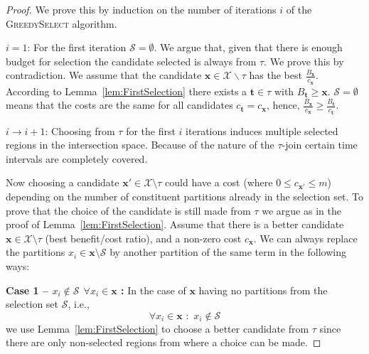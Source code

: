 \begin{proof}{} We prove this by induction on the number of iterations $i$ of the \textsc{GreedySelect} algorithm. 

$i=1$: For the first iteration $\mathcal{S} = \emptyset$. We argue that, given that there is enough budget for selection the candidate selected is always from $\tau$. We prove this by contradiction. We
 assume that the candidate $\mathbf{x} \in \mathcal{X}\backslash \tau$ has the best $\frac{B_\mathbf{x}}{c_\mathbf{x}}$. According to Lemma~\ref{lem:FirstSelection} there exists a $\mathbf{t} \in \tau$ with $B_\mathbf{t} \geq \mathbf{x}$. $\mathcal{S} = \emptyset$ means that the costs are the same for all candidates $c_\mathbf{t} = c_\mathbf{x}$, hence, $\frac{B_\mathbf{x}}{c_\mathbf{x}} \geq \frac{B_\mathbf{t}}{c_\mathbf{t}}$. 

$i\rightarrow i+1$: Choosing from $\tau$ for the first $i$ iterations induces multiple selected regions in the intersection space. Because of the nature of the $\tau$-join certain time intervals are completely covered. 


Now choosing a candidate $\mathbf{x'} \in \mathcal{X}\setminus \tau$ could have a cost (where $0 \le c_\mathbf{x'} \le m$) depending on the number of constituent partitions already in the selection set. To prove that the choice of the candidate is still made from $\tau$ we argue as in the proof of Lemma~\ref{lem:FirstSelection}. Assume that there is a better candidate $\mathbf{x} \in \mathcal{X}\setminus \tau$  (best benefit/cost ratio), and a non-zero cost $c_\mathbf{x}$.  We can always replace the partitions $x_i \in \mathbf{x} \setminus \mathcal{S}$ by another partition of the same term in the following ways:

{\bf Case 1 -- $x_i \notin \mathcal{S} ~~\forall x_i \in \mathbf{x}$ :} In the case of $\mathbf{x}$ having no partitions from the selection set $\mathcal{S}$, i.e.,
$$
\forall x_i \in \mathbf{x}\,\, : \,\, x_i \notin \mathcal{S}
$$
we use Lemma~\ref{lem:FirstSelection} to choose a better candidate from $\tau$ since there are only non-selected regions from where a choice can be made.


\end{proof}
